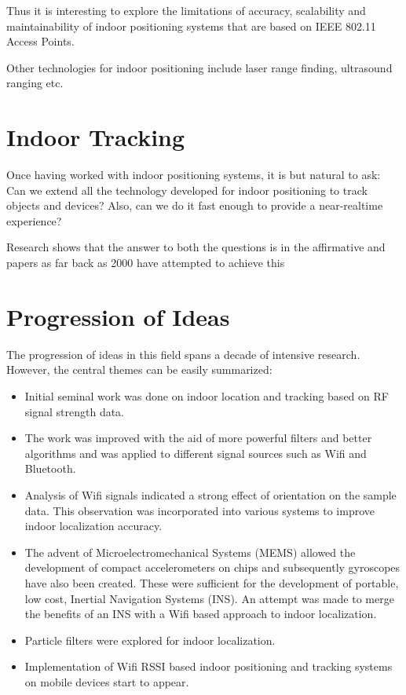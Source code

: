Thus it is interesting to explore the limitations of accuracy, scalability and
maintainability of indoor positioning systems that are based on IEEE 802.11
Access Points.

Other technologies for indoor positioning include laser range finding, 
ultrasound ranging etc. %

\section{Indoor Tracking}

Once having worked with indoor positioning systems, it is but natural to ask:
Can we extend all the technology developed for indoor positioning to track 
objects and devices? Also, can we do it fast enough to provide a near-realtime
experience?

Research shows that the answer to both the questions is in the affirmative
and papers as far back as 2000 \cite{RADAR} have attempted to achieve this 

\section{Progression of Ideas}

The progression of ideas in this field spans a decade of intensive research. 
However, the central themes can be easily summarized:

\begin{itemize}
\item Initial seminal work was done on indoor location and tracking based on RF signal strength data.\cite{RADAR}
\item The work was improved with the aid of more powerful filters and better algorithms and was applied to different signal sources such as Wifi and Bluetooth.\cite{Kotanen}\cite{SpotON}
\item Analysis of Wifi signals indicated a strong effect of orientation on the sample data. This observation was incorporated into various systems to improve indoor localization accuracy.\cite{Ladd}\cite{King}
\item The advent of Microelectromechanical Systems (MEMS) allowed the development of compact accelerometers on chips and subsequently gyroscopes have also been created. These were sufficient for the development of portable, low cost, Inertial Navigation Systems (INS). An attempt was made to merge the benefits of an INS with a Wifi based approach to indoor localization.\cite{Evennou}\cite{Wang}
\item Particle filters were explored for indoor localization.\cite{Arulampalam}\cite{Ristic}\cite{Widyawan}
\item Implementation of Wifi RSSI based indoor positioning and tracking systems on mobile devices start to appear.\cite{Redpin}
\end{itemize}

